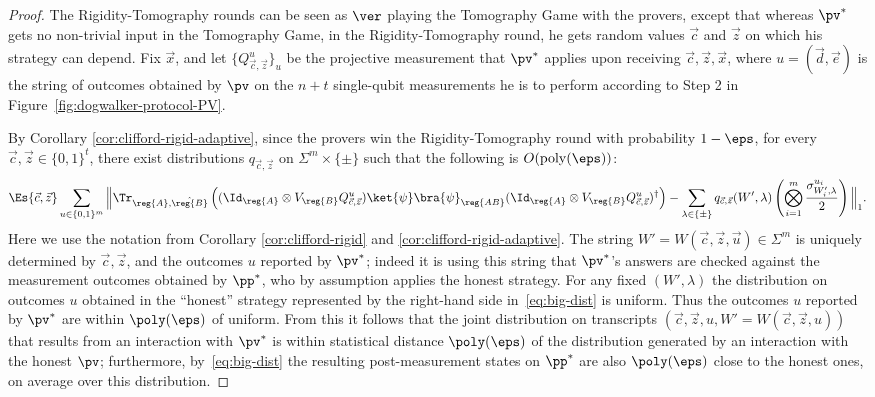 \begin{proof}
The Rigidity-Tomography rounds can be seen as $\ver$ playing the Tomography Game
  with the provers, except that whereas $\pv^*$ gets no non-trivial input in the
  Tomography Game, in the Rigidity-Tomography round, he gets random values
  $\vec{c}$ and $\vec{z}$ on which his strategy can depend. Fix $\vec{x}$, and let
  $\{Q_{\vec{c},\vec{z}}^{u}\}_{u}$ be the projective measurement that $\pv^*$
  applies upon receiving $\vec{c},\vec{z},\vec{x}$, where  $u = (\vec{d},\vec{e})$ is
  the string of outcomes obtained by $\pv$ on the $n+t$ single-qubit
  measurements he is to perform according to Step 2 in
  Figure~\ref{fig:dogwalker-protocol-PV}. 

By Corollary \ref{cor:clifford-rigid-adaptive}, since the provers win the Rigidity-Tomography round with probability $1-\eps$, for every $\vec{c},\vec{z}\in\{0,1\}^t$,
there exist distributions $q_{\vec{c},\vec{z}}$ on $\Sigma^m\times\{\pm\}$ such that the following is $O(\mathrm{poly}(\eps))$:
\begin{equation}\label{eq:big-dist}
\Es{\vec{c},\vec{z}}\sum_{ u\in \{0, 1\}^m}
\Big\| \Tr_{\reg{A},\hat{\reg{B}}}\left((\Id_{\reg{A}}\otimes V_{\reg{B}} Q_{\vec{c},\vec{z}}^{u})\ket{\psi}\bra{\psi}_{\reg{AB}}(\Id_{\reg{A}}\otimes V_{\reg{B}} Q_{\vec{c},\vec{z}}^{u})^\dagger\right)
- \sum_{\lambda\in\{\pm\}}q_{\vec{c},\vec{z}}(W',\lambda)\left(\bigotimes_{i=1}^m \frac{\sigma^{u_i}_{W_i',\lambda}}{2}\right)\Big\|_1. 
\end{equation}
Here we use the notation from Corollary \ref{cor:clifford-rigid} and
  \ref{cor:clifford-rigid-adaptive}. The string
  $W'=W(\vec{c},\vec{z},\vec{u})\in\Sigma^m$ is uniquely determined by
  $\vec{c},\vec{z}$, and the outcomes ${u}$ reported by $\pv^*$; indeed it
  is using this string that $\pv^*$'s answers are checked against the
  measurement outcomes obtained by $\pp^*$, who by assumption applies the
  honest strategy. For any fixed $(W',\lambda)$ the distribution on
  outcomes $u$ obtained in the ``honest'' strategy represented by the right-hand
  side in~\eqref{eq:big-dist} is uniform. Thus the outcomes $u$ reported by
  $\pv^*$ are within $\poly(\eps)$ of uniform. From this it follows that the joint distribution on transcripts $(\vec{c},\vec{z},u,W'=W(\vec{c},\vec{z},u))$ that results from an interaction with $\pv^*$ is within statistical distance $\poly(\eps)$ of the distribution generated by an interaction with the honest $\pv$; furthermore, by~\eqref{eq:big-dist} the resulting post-measurement states on $\pp^*$ are also $\poly(\eps)$ close to the honest ones, on average over this distribution. 


\end{proof}
